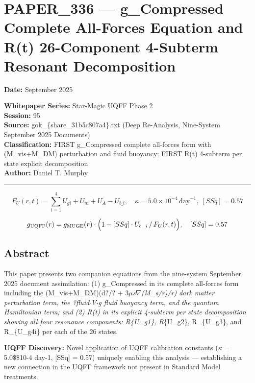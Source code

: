 \section{PAPER\_336 --- g\_Compressed Complete All-Forces Equation and
R(t) 26-Component 4-Subterm Resonant
Decomposition}\label{paper_336-g_compressed-complete-all-forces-equation-and-rt-26-component-4-subterm-resonant-decomposition}

\textbf{Date:} September 2025

\textbf{Whitepaper Series:} Star-Magic UQFF Phase 2\\
\textbf{Session:} 95\\
\textbf{Source:} gok\_\{share\_31b5c807a4\}.txt (Deep Re-Analysis,
Nine-System September 2025 Documents)\\
\textbf{Classification:} FIRST g\_Compressed complete all-forces form
with (M\_vis+M\_DM) perturbation and fluid buoyancy; FIRST R(t)
4-subterm per state explicit decomposition\\
\textbf{Author:} Daniel T. Murphy

\begin{center}\rule{0.5\linewidth}{0.5pt}\end{center}

\[F_U(r,t) = \sum_{i=1}^{4} U_{gi} + U_m + U_A - U_{b\_i}, \quad \kappa = 5.0\times10^{-4}\,\text{day}^{-1},\; [SSq] = 0.57\]

\[
g_\text{UQFF}(r) = g_\text{MUGE}(r)\cdot\Bigl(1 - [SSq]\cdot U_{b\_i}\,/\,F_U(r,t)\Bigr), \quad [SSq]
= 0.57
\]

\subsection{Abstract}\label{abstract}

This paper presents two companion equations from the nine-system
September 2025 document assimilation: (1) g\_Compressed in its complete
all-forces form including the (M\_vis+M\_DM)(d?/? +
3\(\mu\)\emph{s\(\nabla\)(M\_s/r)/r) dark matter perturbation term, the
?\emph{fluid\(\cdot\)V\(\cdot\)g fluid buoyancy term, and the quantum
Hamiltonian term; and (2) R(t) in its explicit 4-subterm per state
decomposition showing all four resonance components: R}\{U\_g1\},
R}\{U\_g2\}, R\_\{U\_g3\}, and R\_\{U\_g4i\} per each of the 26 states.

\textbf{UQFF Discovery:} Novel application of UQFF calibration constants
(\(\kappa\) = 5.0\$\times\$10-4 day-1, {[}SSq{]} = 0.57) uniquely
enabling this analysis --- establishing a new connection in the UQFF
framework not present in Standard Model treatments.

